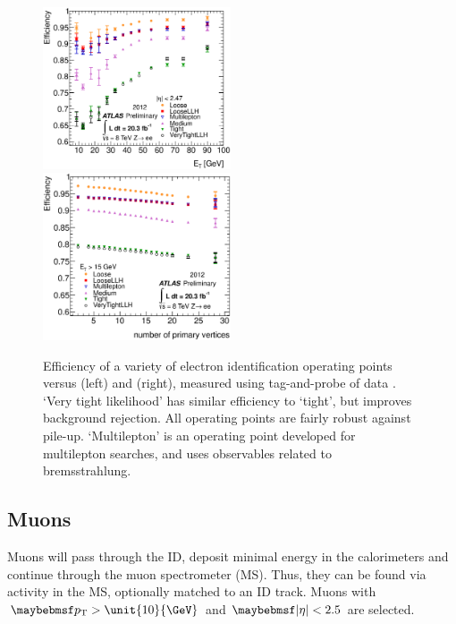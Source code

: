 \begin{description}
	\begin{figure}
		\includegraphics[width=0.495\textwidth]{tex/selection/el_ideff_et}
		\hfill
		\includegraphics[width=0.495\textwidth]{tex/selection/el_ideff_npv}
		\caption{Efficiency of a variety of electron identification operating points 
		versus \et (left) and \npv (right), measured using tag-and-probe of 
		\HepProcess{\PZ \HepTo \Pe\Pe} data \cite{ElectronPerf:2012}. `Very tight 
		likelihood' has similar efficiency to `tight', but improves background rejection. 
		All operating points are fairly robust against pile-up. `Multilepton' is an 
		operating point developed for multilepton searches, and uses observables related to 
		bremsstrahlung.}
		\label{fig:objects:el_ideff}
	\end{figure}

\end{description}



\subsection{Muons}
\label{sec:objects:muons}

Muons will pass through the ID, deposit minimal energy in the calorimeters and 
continue through the muon spectrometer (MS). Thus, they can be found via activity in the 
MS, optionally matched to an ID track. Muons with $\pt > \unit{10}{\GeV}$ and 
$\mods{\eta} < 2.5$ are selected.

